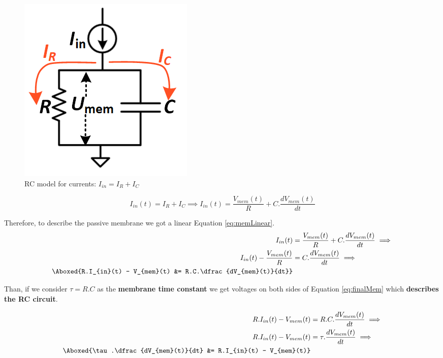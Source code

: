 			
				\begin{figure}[H]
					\centering
					\includegraphics[width=0.6\linewidth]{images/rcmodel2}
					\caption[RC model for currents]{RC model for currents: $I_{in} = I_R + I_C$}
					\label{fig:rcmodel2}
				\end{figure}
			
		
				\begin{equation}
					\label{eq:totalNeuronCurrent}
					I_{in}(t) = I_R + I_C \implies I_{in}(t) = \frac{V_{mem}(t)}{R} + C.\dfrac{dV_{mem}(t)}{dt}
				\end{equation}
				\par Therefore, to describe the passive membrane we got a linear Equation \ref{eq:memLinear}.
				\begin{equation}
					\label{eq:memLinear}
					\begin{aligned}
						I_{in}(t) &= \frac{V_{mem}(t)}{R} + C.\dfrac{dV_{mem}(t)}{dt} \implies \\ 
						I_{in}(t) - \frac{V_{mem}(t)}{R} &=  C.\dfrac{dV_{mem}(t)}{dt} \implies \\
						\Aboxed{R.I_{in}(t) - V_{mem}(t) &=  R.C.\dfrac{dV_{mem}(t)}{dt}}
					\end{aligned}
				\end{equation}
		
				\par Than, if we consider $\tau = R.C$ as the \textbf{membrane time constant} we get voltages on both sides of Equation \ref{eq:finalMem} which \textbf{describes the RC circuit}.
			
				\begin{equation}
					\label{eq:finalMem}
					\begin{aligned}
					R.I_{in}(t) - V_{mem}(t) &=  R.C.\dfrac{dV_{mem}(t)}{dt} \implies \\
					R.I_{in}(t) - V_{mem}(t) &=  \tau.\dfrac{dV_{mem}(t)}{dt} \implies \\
					\Aboxed{\tau.\dfrac{dV_{mem}(t)}{dt} &= R.I_{in}(t) - V_{mem}(t)}
					\end{aligned}
				\end{equation}
			

